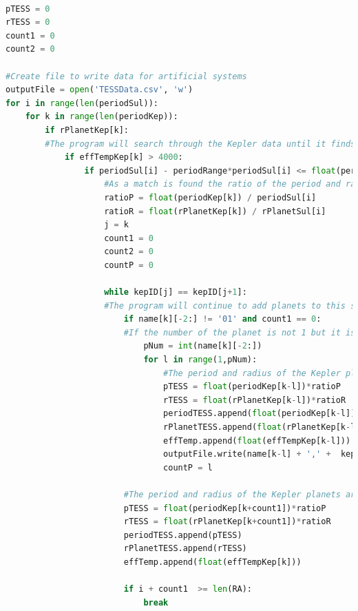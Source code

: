 \documentclass[12pt]{report}
\begin{document}
\begin{appendix}
\begin{lstlisting}[language=Python]
	
pTESS = 0
rTESS = 0
count1 = 0
count2 = 0

#Create file to write data for artificial systems
outputFile = open('TESSData.csv', 'w')
for i in range(len(periodSul)): 		
	for k in range(len(periodKep)):
		if rPlanetKep[k]:
		#The program will search through the Kepler data until it finds a planet within the period and radius limits and in the correct effective temperature group.
			if effTempKep[k] > 4000:		
				if periodSul[i] - periodRange*periodSul[i] <= float(periodKep[k]) <= periodSul[i] + periodRange*periodSul[i] and rPlanetSul[i] - radiusRange*rPlanetSul[i] <= float(rPlanetKep[k]) <= rPlanetSul[i] + radiusRange*rPlanetSul[i] and effTempSul[i] > 4000:
					#As a match is found the ratio of the period and radius  are calculated
					ratioP = float(periodKep[k]) / periodSul[i]	
					ratioR = float(rPlanetKep[k]) / rPlanetSul[i]
					j = k
					count1 = 0
					count2 = 0
					countP = 0

					while kepID[j] == kepID[j+1]:
					#The program will continue to add planets to this system as long as the Kepler ID is the same as the next ID in the list.
						if name[k][-2:] != '01' and count1 == 0:
						#If the number of the planet is not 1 but it is the first planet in the system then the Sullivan data did not include the first planets. These are included here.
							pNum = int(name[k][-2:])
							for l in range(1,pNum):
								#The period and radius of the Kepler planets are multiplied with the ratio of period and radius to create the artificial systems.
								pTESS = float(periodKep[k-l])*ratioP
								rTESS = float(rPlanetKep[k-l])*ratioR
								periodTESS.append(float(periodKep[k-l])/ratioP)
								rPlanetTESS.append(float(rPlanetKep[k-l])/ratioR)
								effTemp.append(float(effTempKep[k-l]))
								outputFile.write(name[k-l] + ',' +  kepID[k-l] + ',' + str(pTESS) + ',' + str(rTESS) + ',' + mStar[k-l] + ',' + numEpoch[k-l] + ','  + transitDur[k-l] + ',' + rStar[k-l] + ',' + str(RA[i]) + ',' + str(dec[i]) + ',' + effTempKep[k] + ',' + str(effTempSul[i]) + ',' + str(ICMag[i]) + '\n')
								countP = l
								
						#The period and radius of the Kepler planets are multiplied with the ratio of period and radius to create the artificial systems.
						pTESS = float(periodKep[k+count1])*ratioP
						rTESS = float(rPlanetKep[k+count1])*ratioR
						periodTESS.append(pTESS)
						rPlanetTESS.append(rTESS)
						effTemp.append(float(effTempKep[k]))
							
						if i + count1  >= len(RA):
							break
							

\end{lstlisting}
\end{appendix}
\end{document}
